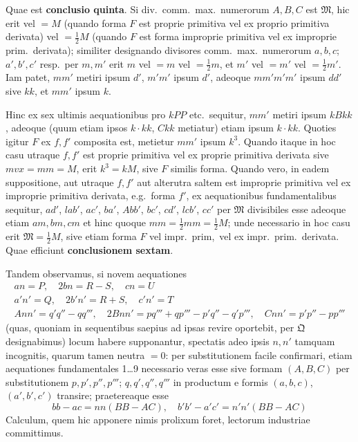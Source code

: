 \documentclass[12pt,a4paper]{article}
\theoremstyle{plain}
\theoremstyle{definition}
\theoremstyle{remark}
\theoremstyle{problemstyle}
\begin{document}
Quae est \textbf{conclusio quinta}. Si div.\ comm.\ max.\ numerorum $A, B, C$ est $\mathfrak{M}$, hic erit vel $=M$ (quando forma $F$ est proprie primitiva vel ex proprio primitiva derivata) vel $=\tfrac{1}{2}M$ (quando $F$ est forma improprie primitiva vel ex improprie prim.\ derivata); similiter designando divisores comm.\ max.\ numerorum $a, b, c$; $a', b', c'$ resp.\ per $m, m'$ erit $m$ vel $=m$ vel $=\tfrac{1}{2}m$, et $m'$ vel $=m'$ vel $=\tfrac{1}{2}m'$. Iam patet, $mm'$ metiri ipsum $d'$, $m'm'$ ipsum $d'$, adeoque $mm'm'm'$ ipsum $dd'$ sive $kk$, et $mm'$ ipsum $k$.

Hinc ex sex ultimis aequationibus pro $kPP$ etc.\ sequitur, $mm'$ metiri ipsum $kBkk$, adeoque (quum etiam ipsos $k \cdot kk$, $Ckk$ metiatur) etiam ipsum $k \cdot kk$. Quoties igitur $F$ ex $f, f'$ composita est, metietur $mm'$ ipsum $k^3$. Quando itaque in hoc casu utraque $f, f'$ est proprie primitiva vel ex proprie primitiva derivata sive $mvx = mm = M$, erit $k^3 = kM$, sive $F$ similis forma. Quando vero, in eadem suppositione, aut utraque $f, f'$ aut alterutra saltem est improprie primitiva vel ex improprie primitiva derivata, e.g.\ forma $f'$, ex aequationibus fundamentalibus sequitur, $ad'$, $lab'$, $ac'$, $ba'$, $Abb'$, $bc'$, $cd'$, $lcb'$, $cc'$ per $\mathfrak{M}$ divisibiles esse adeoque etiam $am, bm, cm$ et hinc quoque $mm = \tfrac{1}{2}mm = \tfrac{1}{2}M$; unde necessario in hoc casu erit $\mathfrak{M} = \tfrac{1}{2}M$, sive etiam forma $F$ vel impr.\ prim,\ vel ex impr.\ prim.\ derivata. Quae efficiunt \textbf{conclusionem sextam}.

Tandem observamus, si novem aequationes
\begin{gather*}
an = P, \quad 2bn = R - S, \quad cn = U \\
a'n' = Q, \quad 2b'n' = R + S, \quad c'n' = T \\
Ann' = q'q'' - qq''', \quad 2Bnn' = pq''' + qp''' - p'q'' - q'p''', \quad Cnn' = p'p'' - pp'''
\end{gather*}
(quas, quoniam in sequentibus saepius ad ipsas revire oportebit, per $\mathfrak{Q}$ designabimus) locum habere supponantur, spectatis adeo ipsis $n, n'$ tamquam incognitis, quarum tamen neutra $=0$: per substitutionem facile confirmari, etiam aequationes fundamentales 1\ldots 9 necessario veras esse sive formam $(A, B, C)$ per substitutionem $p, p', p'', p'''$; $q, q', q'', q'''$ in productum e formis $(a, b, c)$, $(a', b', c')$ transire; praetereaque esse
\[
bb - ac = nn(BB - AC), \quad b'b' - a'c' = n'n'(BB - AC)
\]
Calculum, quem hic apponere nimis prolixum foret, lectorum industriae committimus.
\end{document}
